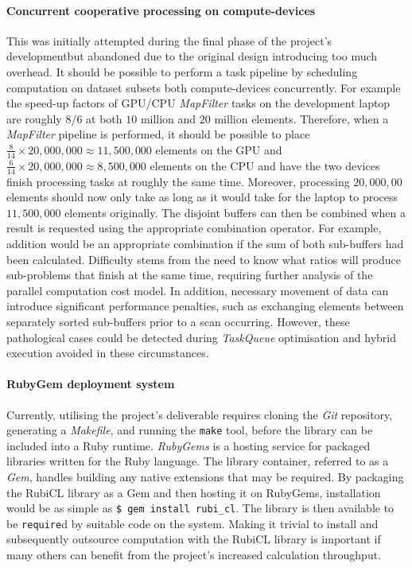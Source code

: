 \paragraph*{Concurrent cooperative processing on compute-devices} This was initially attempted during the final phase of the project's developmentbut abandoned due to the original design introducing too much overhead. It should be possible to perform a task pipeline by scheduling computation on dataset subsets both compute-devices concurrently. For example the speed-up factors of \ac{GPU}/\ac{CPU} \emph{MapFilter} tasks on the development laptop are roughly $8$/$6$ at both $10$ million and $20$ million elements. Therefore, when a \emph{MapFilter} pipeline is performed, it should be possible to place $\frac{8}{14} \times 20,000,000 \approx 11,500,000$ elements on the \ac{GPU} and $\frac{6}{14} \times 20,000,000 \approx 8,500,000$ elements on the \ac{CPU} and have the two devices finish processing tasks at roughly the same time. Moreover, processing $20,000,00$ elements should now only take as long as it would take for the laptop to process $11,500,000$ elements originally. The disjoint buffers can then be combined when a result is requested using the appropriate combination operator. For example, addition would be an appropriate combination if the sum of both sub-buffers had been calculated. Difficulty stems from the need to know what ratios will produce sub-problems that finish at the same time, requiring further analysis of the parallel computation cost model. In addition, necessary movement of data can introduce significant performance penalties, such as exchanging elements between separately sorted sub-buffers prior to a scan occurring. However, these pathological cases could be detected during \emph{TaskQueue} optimisation and hybrid execution avoided in these circumstances.

\paragraph*{RubyGem deployment system}
Currently, utilising the project's deliverable requires cloning the \emph{Git} repository, generating a \emph{Makefile}, and running the \verb|make| tool, before the library can be included into a Ruby runtime.
\emph{RubyGems}\cite{rubygems} is a hosting service for packaged libraries written for the Ruby language. The library container, referred to as a \emph{Gem}, handles building any native extensions that may be required.
By packaging the RubiCL library as a Gem and then hosting it on RubyGems, installation would be as simple as \verb|$ gem install rubi_cl|. The library is then available to be \verb|require|d by suitable code on the system. Making it trivial to install and subsequently outsource computation with the RubiCL library is important if many others can benefit from the project's increased calculation throughput.
